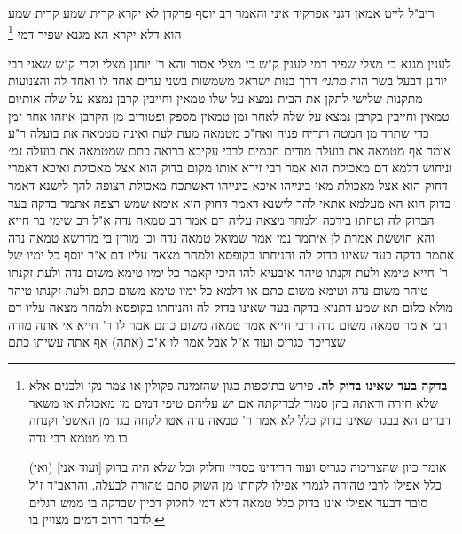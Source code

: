 \documentclass[12pt, openany]{book}
\newcommand{\footnotecomment}[1]{\footnote{#1}}
\newcommand{\commenta}[1]{\footnotecomment{#1}}
\begin{document}
{ריב"ל לייט אמאן דגני אפרקיד  איני והאמר רב יוסף  פרקדן לא יקרא קרית שמע קרית שמע הוא דלא יקרא הא מגנא שפיר דמי 
\commenta{\textbf{בדקה בעד שאינו בדוק לה.}  פירש בתוספות כגון שהזמינה פקולין או צמר נקי ולבנים אלא שלא חזרה וראתה בהן סמוך לבדיקתה אם יש עליהם טיפי דמים מן מאכולת או משאר דברים הא בבגד שאינו בדוק כלל לא אמר ר' טמאה נדה אטו לקחה בגד מן האשפ' וקנחה בו מי מטמא רבי נדה.\par  (ואי) [ועוד אני] אומר כיון שהצריכוה כגריס ועוד הרידינו כסדין וחלוק וכל שלא היה בדוק כלל אפילו לרבי טהורה לגמרי אפילו לקחתו מן השוק סתם טהורה לבעלה. והראב"ד ז"ל סובר דבעד אפילו אינו בדוק כלל טמאה דלא דמי לחלוק דכיון שבדקה בו ממש רגלים לדבר דרוב דמים מצויין בו. }

לענין מגנא כי מצלי שפיר דמי לענין ק"ש כי מצלי אסור  והא ר' יוחנן מצלי וקרי ק"ש  שאני רבי יוחנן דבעל בשר הוה
{\large\emph{מתני׳}} דרך בנות ישראל משמשות בשני עדים אחד לו ואחד לה והצנועות מתקנות שלישי לתקן את הבית 
נמצא על שלו טמאין וחייבין קרבן  נמצא על שלה אותיום טמאין וחייבין בקרבן  נמצא על שלה לאחר זמן טמאין מספק ופטורים מן הקרבן 
איזהו אחר זמן  כדי שתרד מן המטה ותדיח פניה ואח"כ מטמאה מעת לעת ואינה מטמאה את בועלה  ר"ע אומר  אף מטמאה את בועלה 
מודים חכמים לרבי עקיבא ברואה כתם שמטמאה את בועלה
{\large\emph{גמ׳}} וניחוש דלמא דם מאכולת הוא אמר רבי זירא  אותו מקום בדוק הוא אצל מאכולת ואיכא דאמרי  דחוק הוא אצל מאכולת 
מאי בינייהו  איכא בינייהו דאשתכח מאכולת רצופה להך לישנא דאמר בדוק הוא הא מעלמא אתאי להך לישנא דאמר דחוק הוא אימא שמש רצפה 
אתמר בדקה בעד הבדוק לה וטחתו בירכה ולמחר מצאה עליה דם אמר רב  טמאה נדה  א"ל רב שימי בר חייא  והא חוששת אמרת לן 
איתמר נמי אמר שמואל  טמאה נדה  וכן מורין בי מדרשא  טמאה נדה 
אתמר בדקה בעד שאינו בדוק לה והניחתו בקופסא ולמחר מצאה עליו דם א"ר יוסף  כל ימיו של ר' חייא טימא ולעת זקנתו טיהר 
איבעיא להו  היכי קאמר  כל ימיו טימא משום נדה ולעת זקנתו טיהר משום נדה וטימא משום כתם 
או דלמא  כל ימיו טימא משום כתם ולעת זקנתו טיהר מולא כלום 
תא שמע דתניא  בדקה בעד שאינו בדוק לה והניחתו בקופסא ולמחר מצאה עליו דם רבי אומר  טמאה משום נדה ורבי חייא אמר  טמאה משום כתם
אמר לו ר' חייא  אי אתה מודה שצריכה כגריס ועוד  א"ל  אבל  אמר לו  א"כ (אתה) אף אתה עשיתו כתם 
}
\end{document}

